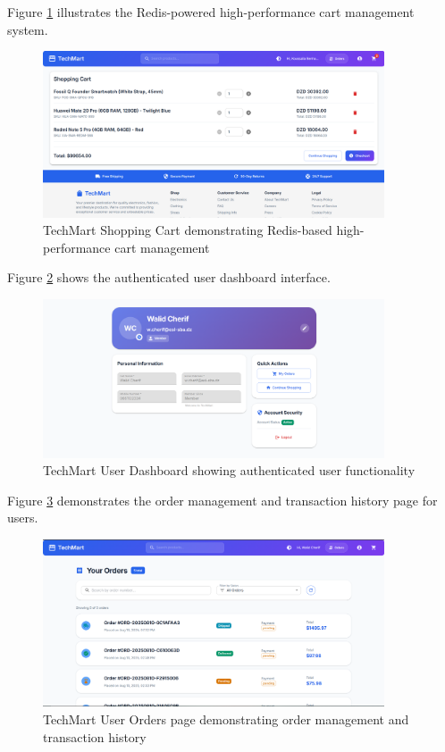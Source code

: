 Figure \ref{fig:techmart-shopping-cart} illustrates the Redis-powered high-performance cart management system.

\begin{figure}[H]
\centering
\includegraphics[width=0.9\textwidth]{figures/chapter5/techmart-shopping-cart.png}
\caption{TechMart Shopping Cart demonstrating Redis-based high-performance cart management}
\label{fig:techmart-shopping-cart}
\end{figure}

Figure \ref{fig:techmart-user-dashboard} shows the authenticated user dashboard interface.

\begin{figure}[H]
\centering
\includegraphics[width=0.9\textwidth]{figures/chapter5/techmart-user-dashboard.png}
\caption{TechMart User Dashboard showing authenticated user functionality}
\label{fig:techmart-user-dashboard}
\end{figure}

Figure \ref{fig:techmart-user-orders} demonstrates the order management and transaction history page for users.

\begin{figure}[H]
\centering
\includegraphics[width=0.9\textwidth]{figures/chapter5/techmart-user-orders.png}
\caption{TechMart User Orders page demonstrating order management and transaction history}
\label{fig:techmart-user-orders}
\end{figure}


